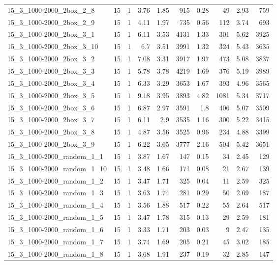 \begin{center}
\begin{scriptsize}
\begin{longtable}{lrrrrrrrrr}
15\_3\_1000-2000\_2box\_2\_8 & 15 & 1 & 3.76 & 1.85 & 915 & 0.28 & 49 & 2.93 & 759\\
15\_3\_1000-2000\_2box\_2\_9 & 15 & 1 & 4.11 & 1.97 & 735 & 0.56 & 112 & 3.74 & 693\\
15\_3\_1000-2000\_2box\_3\_1 & 15 & 1 & 6.11 & 3.53 & 4131 & 1.33 & 301 & 5.62 & 3925\\
15\_3\_1000-2000\_2box\_3\_10 & 15 & 1 & 6.7 & 3.51 & 3991 & 1.32 & 324 & 5.43 & 3635\\
15\_3\_1000-2000\_2box\_3\_2 & 15 & 1 & 7.08 & 3.31 & 3917 & 1.97 & 473 & 5.08 & 3837\\
15\_3\_1000-2000\_2box\_3\_3 & 15 & 1 & 5.78 & 3.78 & 4219 & 1.69 & 376 & 5.19 & 3989\\
15\_3\_1000-2000\_2box\_3\_4 & 15 & 1 & 6.33 & 3.29 & 3653 & 1.67 & 393 & 4.96 & 3565\\
15\_3\_1000-2000\_2box\_3\_5 & 15 & 1 & 9.18 & 3.95 & 3893 & 4.82 & 1081 & 5.34 & 3717\\
15\_3\_1000-2000\_2box\_3\_6 & 15 & 1 & 6.87 & 2.97 & 3591 & 1.8 & 406 & 5.07 & 3509\\
15\_3\_1000-2000\_2box\_3\_7 & 15 & 1 & 6.11 & 2.9 & 3535 & 1.16 & 300 & 5.22 & 3415\\
15\_3\_1000-2000\_2box\_3\_8 & 15 & 1 & 4.87 & 3.56 & 3525 & 0.96 & 234 & 4.88 & 3399\\
15\_3\_1000-2000\_2box\_3\_9 & 15 & 1 & 6.22 & 3.65 & 3777 & 2.16 & 504 & 5.42 & 3651\\
15\_3\_1000-2000\_random\_1\_1 & 15 & 1 & 3.87 & 1.67 & 147 & 0.15 & 34 & 2.45 & 129\\
15\_3\_1000-2000\_random\_1\_10 & 15 & 1 & 3.48 & 1.66 & 171 & 0.08 & 21 & 2.67 & 139\\
15\_3\_1000-2000\_random\_1\_2 & 15 & 1 & 3.47 & 1.71 & 325 & 0.04 & 11 & 2.59 & 325\\
15\_3\_1000-2000\_random\_1\_3 & 15 & 1 & 3.63 & 1.74 & 281 & 0.29 & 50 & 2.69 & 187\\
15\_3\_1000-2000\_random\_1\_4 & 15 & 1 & 3.56 & 1.88 & 517 & 0.22 & 55 & 2.64 & 517\\
15\_3\_1000-2000\_random\_1\_5 & 15 & 1 & 3.47 & 1.78 & 315 & 0.13 & 29 & 2.59 & 181\\
15\_3\_1000-2000\_random\_1\_6 & 15 & 1 & 3.33 & 1.71 & 203 & 0.03 & 9 & 2.47 & 135\\
15\_3\_1000-2000\_random\_1\_7 & 15 & 1 & 3.74 & 1.69 & 205 & 0.21 & 45 & 3.02 & 185\\
15\_3\_1000-2000\_random\_1\_8 & 15 & 1 & 3.68 & 1.91 & 237 & 0.19 & 32 & 2.85 & 147\\

\end{longtable}
\end{scriptsize}
\end{center}
